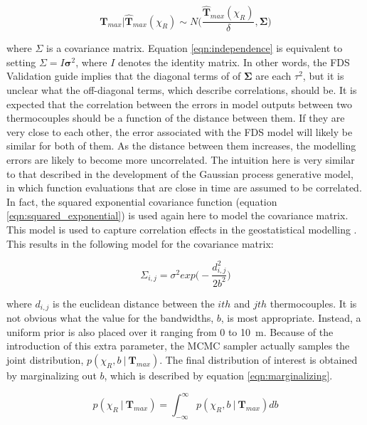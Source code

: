 \documentclass{article}
\begin{document}
\begin{equation}
  \label{eqn:mv_likelihood}
    \boldsymbol{T}_{max} \bigg| \boldsymbol{\hat{T}}_{max}(\chi_R) \sim N\Bigg( \frac{\hat{\boldsymbol{T}}_{max}(\chi_R)}{\delta}, \boldsymbol\Sigma \Bigg)
\end{equation}

\noindent where $\Sigma$ is a covariance matrix. Equation \ref{eqn:independence} is equivalent to setting $\Sigma = I\boldsymbol{\sigma}^2$, where $I$ denotes the identity matrix. In other words, the FDS Validation guide implies that the diagonal terms of of $\boldsymbol\Sigma$ are each $\tau^2$, but it is unclear what the off-diagonal terms, which describe correlations, should be. It is expected that the correlation between the errors in model outputs between two thermocouples should be a function of the distance between them. If they are very close to each other, the error associated with the FDS model will likely be similar for both of them. As the distance between them increases, the modelling errors are likely to become more uncorrelated. The intuition here is very similar to that described in the development of the Gaussian process generative model, in which function evaluations that are close in time are assumed to be correlated. In fact, the squared exponential covariance function (equation \ref{eqn:squared_exponential}) is used again here to model the covariance matrix. This model is used to capture correlation effects in the geostatistical modelling \cite{f2007methods}. This results in the following model for the covariance matrix:

 \begin{equation}
  \label{eqn:squared_exponential_spatial}
    \Sigma_{i,j}= \sigma^2exp\bigg(-\frac{d_{i,j}^2}{2b^2}\bigg)
\end{equation}

\noindent where $d_{i,j}$ is the euclidean distance between the $ith$ and $jth$ thermocouples. It is not obvious what the value for the bandwidths, $b$, is most appropriate. Instead, a uniform prior is also placed over it ranging from 0 to 10~m. Because of the introduction of this extra parameter, the MCMC sampler actually samples the joint distribution, $p(\chi_R, b \ | \ \boldsymbol{T}_{max})$. The final distribution of interest is obtained by marginalizing out $b$, which is described by equation \ref{eqn:marginalizing}.

 \begin{equation}
  \label{eqn:marginalizing}
   p(\chi_R \ | \ \boldsymbol{T}_{max}) = \int_{-\infty}^{\infty} p(\chi_R, b \ | \ \boldsymbol{T}_{max}) db
\end{equation}
\end{document}
